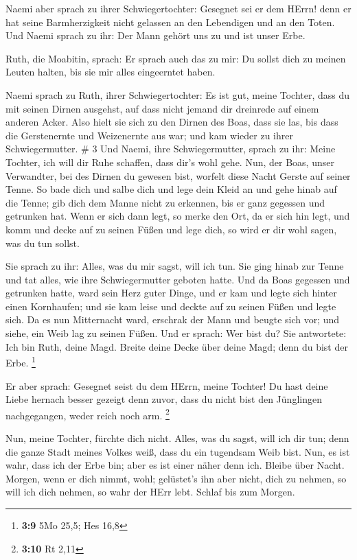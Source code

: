  Naemi aber sprach zu ihrer Schwiegertochter: Gesegnet sei
er dem HErrn! denn er hat seine Barmherzigkeit nicht gelassen an den
Lebendigen und an den Toten. Und Naemi sprach zu ihr: Der Mann gehört
uns zu und ist unser Erbe.

 Ruth, die Moabitin, sprach: Er sprach auch das zu mir: Du
sollst dich zu meinen Leuten halten, bis sie mir alles eingeerntet
haben.

 Naemi sprach zu Ruth, ihrer Schwiegertochter: Es ist gut,
meine Tochter, dass du mit seinen Dirnen ausgehst, auf dass nicht jemand
dir dreinrede auf einem anderen Acker.  Also hielt sie sich
zu den Dirnen des Boas, dass sie las, bis dass die Gerstenernte und
Weizenernte aus war; und kam wieder zu ihrer Schwiegermutter. \# 3
 Und Naemi, ihre Schwiegermutter, sprach zu ihr: Meine
Tochter, ich will dir Ruhe schaffen, dass dir's wohl gehe. 
Nun, der Boas, unser Verwandter, bei des Dirnen du gewesen bist, worfelt
diese Nacht Gerste auf seiner Tenne.  So bade dich und salbe
dich und lege dein Kleid an und gehe hinab auf die Tenne; gib dich dem
Manne nicht zu erkennen, bis er ganz gegessen und getrunken hat.
 Wenn er sich dann legt, so merke den Ort, da er sich hin
legt, und komm und decke auf zu seinen Füßen und lege dich, so wird er
dir wohl sagen, was du tun sollst.

 Sie sprach zu ihr: Alles, was du mir sagst, will ich tun.
 Sie ging hinab zur Tenne und tat alles, wie ihre
Schwiegermutter geboten hatte.  Und da Boas gegessen und
getrunken hatte, ward sein Herz guter Dinge, und er kam und legte sich
hinter einen Kornhaufen; und sie kam leise und deckte auf zu seinen
Füßen und legte sich.  Da es nun Mitternacht ward, erschrak
der Mann und beugte sich vor; und siehe, ein Weib lag zu seinen Füßen.
 Und er sprach: Wer bist du? Sie antwortete: Ich bin Ruth,
deine Magd. Breite deine Decke über deine Magd; denn du bist der Erbe.
\footnote{\textbf{3:9} 5Mo 25,5; Hes 16,8}

 Er aber sprach: Gesegnet seist du dem HErrn, meine
Tochter! Du hast deine Liebe hernach besser gezeigt denn zuvor, dass du
nicht bist den Jünglingen nachgegangen, weder reich noch arm.
\footnote{\textbf{3:10} Rt 2,11}

 Nun, meine Tochter, fürchte dich nicht. Alles, was du
sagst, will ich dir tun; denn die ganze Stadt meines Volkes weiß, dass
du ein tugendsam Weib bist.  Nun, es ist wahr, dass ich der
Erbe bin; aber es ist einer näher denn ich.  Bleibe über
Nacht. Morgen, wenn er dich nimmt, wohl; gelüstet's ihn aber nicht, dich
zu nehmen, so will ich dich nehmen, so wahr der HErr lebt. Schlaf bis
zum Morgen.


